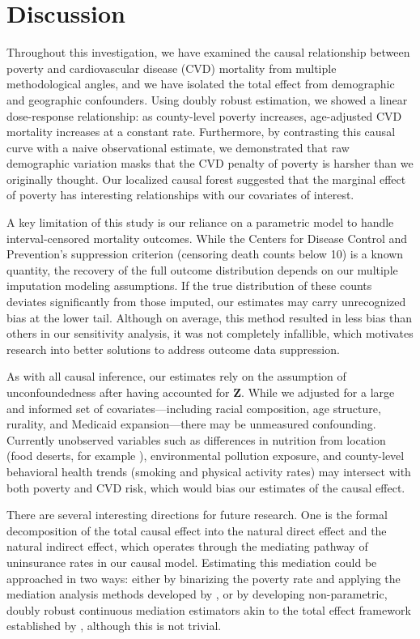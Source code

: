 \documentclass{article}
\theoremstyle{plain}
\theoremstyle{definition}
\theoremstyle{remark}
\begin{document}
\section{Discussion}
\label{discussion}

Throughout this investigation, we have examined the causal relationship 
between poverty and cardiovascular disease (CVD) mortality from multiple 
methodological angles, and we have isolated the total effect from demographic and geographic confounders. Using doubly 
robust estimation, we showed a linear dose-response relationship: as 
county-level poverty increases, age-adjusted CVD mortality increases at a constant rate. Furthermore, by contrasting this causal curve with a 
naive observational estimate, we demonstrated that raw demographic variation masks that the CVD penalty of poverty is harsher than we originally thought. Our localized causal forest suggested that the marginal effect of poverty has interesting relationships with our covariates of interest.

A key 
limitation of this study is our reliance on a parametric model to handle 
interval-censored mortality outcomes. While the Centers for Disease Control and 
Prevention's suppression criterion (censoring death counts below 10) is a 
known quantity, the recovery of the full outcome distribution depends 
on our multiple imputation modeling assumptions. If the true 
distribution of these counts deviates significantly from those imputed, our estimates may carry unrecognized bias at the lower tail. Although on average, this method resulted in less bias than others in our sensitivity analysis, it was not completely infallible, which motivates research into better solutions to address outcome data suppression.

As with all causal inference, our estimates 
rely on the assumption of unconfoundedness after having accounted for $\mathbf Z$. While we 
adjusted for a large and informed set of covariates—including racial composition, 
age structure, rurality, and Medicaid expansion—there may be unmeasured confounding. Currently unobserved variables such as differences in nutrition from location (food deserts, for example \citep{karpyn2019changing, kelli2019living}), environmental pollution exposure, and county-level behavioral health trends (smoking and physical activity rates) may intersect with both poverty and CVD risk, which would bias our estimates of the causal effect.

There are several interesting directions for future research. One is the formal decomposition of the 
total causal effect into the natural direct effect and the natural indirect effect, 
which operates through the mediating pathway of uninsurance rates in our causal model.  Estimating this 
mediation could be approached in two ways: either by binarizing the poverty rate 
and applying the mediation analysis methods developed by 
\citet{farbmacher2022causal}, or by developing non-parametric, doubly robust continuous mediation estimators 
akin to the total effect framework established by \citet{kennedy2017non}, although this is not trivial.
\end{document}
